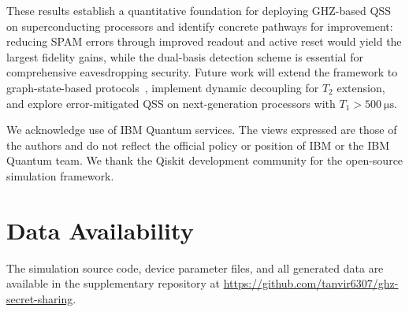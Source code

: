 \documentclass[aip, amsmath, amssymb, preprint, longbibliography]{revtex4-2}
\begin{document}
These results establish a quantitative foundation for deploying GHZ-based
QSS on superconducting processors and identify concrete pathways for
improvement: reducing SPAM errors through improved readout and active
reset would yield the largest fidelity gains, while the dual-basis
detection scheme is essential for comprehensive eavesdropping security.
Future work will extend the framework to graph-state-based
protocols~\cite{Bell2014}, implement dynamic decoupling for
$T_2$ extension, and explore error-mitigated QSS on next-generation
processors with $T_1>\SI{500}{\micro\second}$.

\begin{acknowledgments}
We acknowledge use of IBM Quantum services. The views expressed are those
of the authors and do not reflect the official policy or position of IBM
or the IBM Quantum team. We thank the Qiskit development community for
the open-source simulation framework.
\end{acknowledgments}

\section*{Data Availability}
The simulation source code, device parameter files, and all generated
data are available in the supplementary repository at
\url{https://github.com/tanvir6307/ghz-secret-sharing}.


\end{document}
